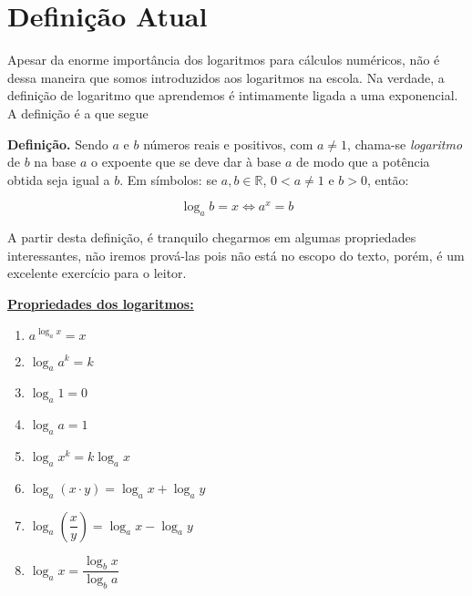 \section{Definição Atual}

Apesar da enorme importância dos logaritmos para cálculos numéricos, não é dessa maneira que somos introduzidos aos logaritmos na escola. Na verdade, a definição de logaritmo que aprendemos é intimamente ligada a uma exponencial. A definição é a que segue

\textbf{Definição.} Sendo $a$ e $b$ números reais e positivos, com $a \neq 1$, chama-se \textit{logaritmo} de $b$ na base $a$ o expoente que se deve dar à base $a$ de modo que a potência obtida seja igual a $b$.
Em símbolos: se $a, b \in \mathbb{R}$, $0 < a \neq 1$ e $b > 0$, então:

\[
\log_{a} b = x \iff a^x = b
\]

A partir desta definição, é tranquilo chegarmos em algumas propriedades interessantes, não iremos prová-las pois não está no escopo do texto, porém, é um excelente exercício para o leitor.

\vspace{8pt}
\noindent\textbf{\underline{Propriedades dos logaritmos:}}

\begin{multicols}{2}
\begin{enumerate}
    \item ${a^{\log_a x} = x}$  
    \item ${\log_a a^k = k}$  
    \item ${\log_a 1 = 0}$ 
    \item ${\log_a a = 1}$ 
    \item ${\log_a x^k = k \log_a x}$ 
    \item ${\log_a(x\cdot y) = \log_a x + \log_a y}$ 
    \item ${\log_a\!\left(\dfrac{x}{y}\right) = \log_a x - \log_a y}$
    \item ${\log_a x = \dfrac{\log_b x}{\log_b a}}$ 
\end{enumerate}
\end{multicols}


